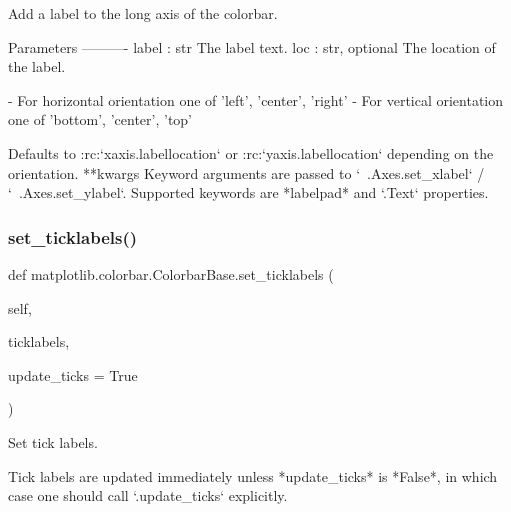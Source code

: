 \begin{DoxyVerb}Add a label to the long axis of the colorbar.

Parameters
----------
label : str
    The label text.
loc : str, optional
    The location of the label.

    - For horizontal orientation one of {'left', 'center', 'right'}
    - For vertical orientation one of {'bottom', 'center', 'top'}

    Defaults to :rc:`xaxis.labellocation` or :rc:`yaxis.labellocation`
    depending on the orientation.
**kwargs
    Keyword arguments are passed to `~.Axes.set_xlabel` /
    `~.Axes.set_ylabel`.
    Supported keywords are *labelpad* and `.Text` properties.
\end{DoxyVerb}
 \mbox{\label{classmatplotlib_1_1colorbar_1_1ColorbarBase_a5e0112e4eab34a20bb4ba9f5a2603277}} 
\subsubsection{\texorpdfstring{set\+\_\+ticklabels()}{set\_ticklabels()}}
{\footnotesize\ttfamily def matplotlib.\+colorbar.\+Colorbar\+Base.\+set\+\_\+ticklabels (\begin{DoxyParamCaption}\item[{}]{self,  }\item[{}]{ticklabels,  }\item[{}]{update\+\_\+ticks = {\ttfamily True} }\end{DoxyParamCaption})}

\begin{DoxyVerb}Set tick labels.

Tick labels are updated immediately unless *update_ticks* is *False*,
in which case one should call `.update_ticks` explicitly.
\end{DoxyVerb}
 \mbox{\label{classmatplotlib_1_1colorbar_1_1ColorbarBase_a18e35f3170680d0b908bbbe80773042c}} 
